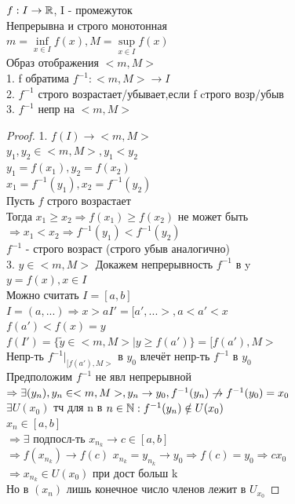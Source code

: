 \begin{theorem}
	$ f : I \rightarrow \mathbb{R} $, I - промежуток \\
	Непрерывна и строго монотонная \\
	$ m = \inf\limits_{x \in I} f(x) , M =  \sup\limits_{x \in I} f(x) $\\
	Образ отображения $ <m, M> $ \\ 
	1. f обратима $ f^{-1} : <m, M> \rightarrow I $ \\
	2. $ f^{-1} $ строго возрастает/убывает,если f cтрого возр/убыв \\
	3. $ f^{-1} $ непр на $ <m, M> $
	\begin{proof}
		1. $ f(I) \rightarrow <m, M>$\\
		$ y_1, y_2 \in <m, M> , y_1 < y_2 $ \\
		$ y_1 = f ( x_1 ) , y_2 = f(x_2) $ \\
		$ x_1 = f^{-1} (y_1), x_2 = f^{-1} (y_2) $ \\
		Пусть $f$ строго возрастает \\
		Тогда $ x_1 \geq x_2 \Rightarrow f(x_1) \geq f(x_2) $ не может быть \\ %
		$ \Rightarrow x_1 < x_2 \Rightarrow f^{-1} (y_1) < f^{-1} (y_2) $\\		
		$f^{-1}$ - строго возраст (строго убыв аналогично)\\
		3. $ y \in <m, M> $ Докажем непрерывность $ f^{-1} $ в y \\
		$ y = f(x), x \in I $ \\
		Можно считать $ I = [a, b] $ \\
		$ I = (a, ...) \Rightarrow x > a I' = [a', ...>, a < a' < x $ \\
		$f(a') < f(x) = y $ \\
		$ f(I') = \{\tilde{y} \in <m, M> | y \geq f(a') \} = [f(a'), M> $ \\
		Непр-ть $ f^{-1} |_{[f(a'), M> } $ в $y_0 $  влечёт непр-ть $ f^{-1} $ в $ y_0 $ \\
		Предположим $f^{-1} $ не явл непрерывной \\
		$  \Rightarrow \exists (y_n) , y_n \in <m, M>, y_n \rightarrow y_0, f^{-1} (y_n) \centernot\rightarrow f^{-1} (y_0) = x_0 $ \\
		$ \exists U(x_0) $ тч для n в $ n \in \mathbb{N} : f^{-1} (y_n) \notin U(x_0) $\\
		$ x_n \in [a, b] $ \\
		$ \Rightarrow \exists $ подпосл-ть $ x_{n_k} \rightarrow c \in [a,b] $ \\
		$ \Rightarrow f(x_{n_k}) \rightarrow f(c)   $
		$ x_{n_k} = y_{n_k} \rightarrow y_0  \Rightarrow f(c) = y_0 \Rightarrow c x_0 $\\
		$ \Rightarrow x_{n_k} \in U(x_0) $ при дост больш k \\
		Но в $( x_n )$ лишь конечное число членов лежит в $ U_{x_0} $ 
	\end{proof}
\end{theorem}
